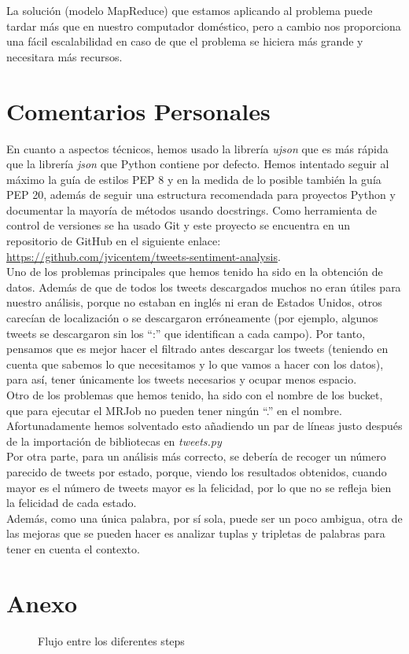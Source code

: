 \documentclass[12pt,a4paper]{article}
\begin{document}
La solución (modelo MapReduce) que estamos aplicando al problema puede tardar más que en nuestro computador doméstico, pero a cambio nos proporciona una fácil escalabilidad en caso de que el problema se hiciera más grande y necesitara más recursos.

\section{Comentarios Personales}

En cuanto a aspectos técnicos, hemos usado la librería \textit{ujson} que es más rápida que la librería \textit{json} que Python contiene por defecto. Hemos intentado seguir al máximo la guía de estilos PEP 8 y en la medida de lo posible también la guía PEP 20, además de seguir una estructura recomendada para proyectos Python y documentar la mayoría de métodos usando docstrings.
Como herramienta de control de versiones se ha usado Git y este proyecto se encuentra en un repositorio de GitHub en el siguiente enlace: \url{https://github.com/jvicentem/tweets-sentiment-analysis}.\\

Uno de los problemas principales que hemos tenido ha sido en la obtención de datos. Además de que de todos los tweets descargados muchos no eran útiles para nuestro análisis, porque no estaban en inglés ni eran de Estados Unidos, otros carecían de localización o se descargaron erróneamente (por ejemplo, algunos tweets se descargaron sin los ``:'' que identifican a cada campo). Por tanto, pensamos que es mejor hacer el filtrado antes descargar los tweets (teniendo en cuenta que sabemos lo que necesitamos y lo que vamos a hacer con los datos), para así, tener únicamente los tweets necesarios y ocupar menos espacio.\\

Otro de los problemas que hemos tenido, ha sido con el nombre de los bucket, que para ejecutar el MRJob no pueden tener ningún ``.'' en el nombre. Afortunadamente hemos solventado esto añadiendo un par de líneas justo después de la importación de bibliotecas en \textit{tweets.py}\\


Por otra parte, para un análisis más correcto, se debería de recoger un número parecido de tweets por estado, porque, viendo los resultados obtenidos, cuando mayor es el número de tweets mayor es la felicidad, por lo que no se refleja bien la felicidad de cada estado.\\
Además, como una única palabra, por sí sola, puede ser un poco ambigua, otra de las mejoras que se pueden hacer es analizar tuplas y tripletas de palabras para tener en cuenta el contexto.\\

\section{Anexo}
\begin{figure}[htp]
\caption{Flujo entre los diferentes steps}
\end{figure}
\end{document}
